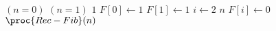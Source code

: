 \begin{codebox}
\li \If $(n = 0)$ \Or $(n = 1)$
\li	\Then
		\Return $1$
	\End
\li	$F[0] \gets 1$
\li	$F[1] \gets 1$ 
\li \For $i \gets 2$ \To $n$
\li \Do
		$F[i] \gets 0$
	\End
\li \Return $\proc{Rec-Fib}(n)$
\end{codebox}